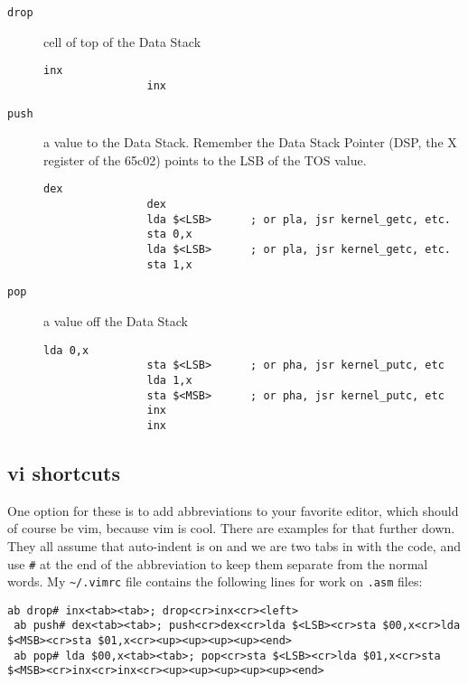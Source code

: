 \begin{description}

        \item [\texttt{drop}] cell of top of the Data Stack 

                \begin{lstlisting}[frame=lines]
                inx
                inx
                \end{lstlisting}

        \item [\texttt{push}] a value to the Data Stack.  Remember the Data Stack
                Pointer (DSP, the X register of the 65c02) points to the LSB of
                the TOS value.

                \begin{lstlisting}[frame=lines]
                dex
                dex
                lda $<LSB>      ; or pla, jsr kernel_getc, etc.
                sta 0,x
                lda $<LSB>      ; or pla, jsr kernel_getc, etc.
                sta 1,x
                \end{lstlisting}

        \item [\texttt{pop}] a value off the Data Stack

                \begin{lstlisting}[frame=lines]
                lda 0,x
                sta $<LSB>      ; or pha, jsr kernel_putc, etc
                lda 1,x
                sta $<MSB>      ; or pha, jsr kernel_putc, etc
                inx
                inx
                \end{lstlisting}

\end{description}

\subsection{vi shortcuts}

One option for these is to add abbreviations to your favorite editor, which
should of course be vim, because vim is cool. There are examples for that
further down. They all assume that auto-indent is on and we are two tabs in with
the code, and use \texttt{\#} at the end of the abbreviation to keep them
separate from the normal words. My \texttt{\textasciitilde/.vimrc} file contains the following
lines for work on \texttt{.asm} files:
 

\begin{lstlisting}[frame=lines]
 ab drop# inx<tab><tab>; drop<cr>inx<cr><left>
 ab push# dex<tab><tab>; push<cr>dex<cr>lda $<LSB><cr>sta $00,x<cr>lda $<MSB><cr>sta $01,x<cr><up><up><up><up><end>
 ab pop# lda $00,x<tab><tab>; pop<cr>sta $<LSB><cr>lda $01,x<cr>sta $<MSB><cr>inx<cr>inx<cr><up><up><up><up><up><end>
\end{lstlisting}
 
